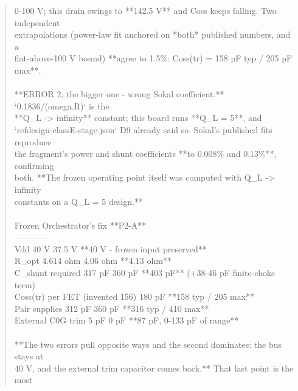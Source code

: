 \documentclass[11pt,a4paper]{article}
\begin{document}
\begin{quote}
0-100 V; this drain swings to {*}{*}142.5 V{*}{*} and Coss keeps falling. Two independent\\
extrapolations (power-law fit anchored on {*}both{*} published numbers, and a\\
flat-above-100 V bound) {*}{*}agree to 1.5\%: Coss(tr) = 158 pF typ / 205 pF max{*}{*}.\\
~\\
{*}{*}ERROR 2, the bigger one - wrong Sokal coefficient.{*}{*} `0.1836/(omega.R)` is the\\
{*}{*}Q\_L -\textgreater{} infinity{*}{*} constant; this board runs {*}{*}Q\_L = 5{*}{*}, and\\
`refdesign-classE-stage.json` D9 already said so. Sokal's published fits reproduce\\
the fragment's power and shunt coefficients {*}{*}to 0.008\% and 0.13\%{*}{*}, confirming\\
both. {*}{*}The frozen operating point itself was computed with Q\_L -\textgreater{} infinity\\
constants on a Q\_L = 5 design.{*}{*}\\
~\\
\textbar{} \textbar{} Frozen \textbar{} Orchestrator's fix \textbar{} {*}{*}P2-A{*}{*} \textbar{}\\
\textbar{}---\textbar{}---\textbar{}---\textbar{}---\textbar{}\\
\textbar{} Vdd \textbar{} 40 V \textbar{} 37.5 V \textbar{} {*}{*}40 V - frozen input preserved{*}{*} \textbar{}\\
\textbar{} R\_opt \textbar{} 4.614 ohm \textbar{} 4.06 ohm \textbar{} {*}{*}4.13 ohm{*}{*} \textbar{}\\
\textbar{} C\_shunt required \textbar{} 317 pF \textbar{} 360 pF \textbar{} {*}{*}403 pF{*}{*} (+38-46 pF finite-choke term) \textbar{}\\
\textbar{} Coss(tr) per FET \textbar{} (invented 156) \textbar{} 180 pF \textbar{} {*}{*}158 typ / 205 max{*}{*} \textbar{}\\
\textbar{} Pair supplies \textbar{} 312 pF \textbar{} 360 pF \textbar{} {*}{*}316 typ / 410 max{*}{*} \textbar{}\\
\textbar{} External C0G trim \textbar{} 5 pF \textbar{} 0 pF \textbar{} {*}{*}87 pF, 0-133 pF of range{*}{*} \textbar{}\\
~\\
{*}{*}The two errors pull opposite ways and the second dominates: the bus stays at\\
40 V, and the external trim capacitor comes back.{*}{*} That last point is the most\\

\end{quote}
\end{document}

